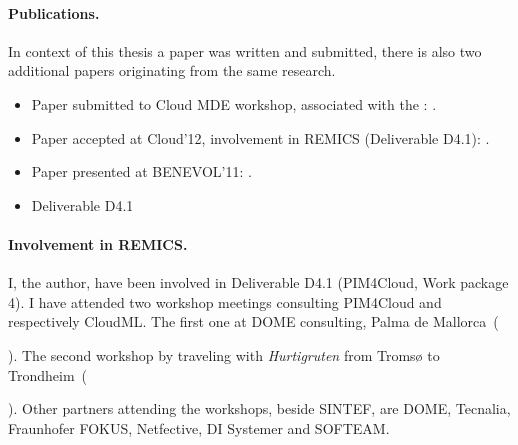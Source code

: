 \paragraph{Publications.}

In context of this thesis a paper was written and submitted,
there is also two additional papers originating from the same research.

\begin{itemize}
  \item
    Paper submitted to Cloud MDE workshop, associated with the :
    .
  \item
    Paper accepted at Cloud'12, involvement in REMICS (Deliverable D4.1):
    .
  \item
    Paper presented at BENEVOL'11:
    .
   \item 
     Deliverable D4.1
\end{itemize}

\paragraph{Involvement in REMICS.}

I, the author, have been involved in  Deliverable D4.1 (PIM4Cloud, Work package 4).
I have attended two workshop meetings consulting PIM4Cloud and respectively CloudML.
The first one at DOME consulting, Palma de Mallorca~(\date{June 2011}).
The second workshop by traveling with \emph{Hurtigruten} from Tromsø to Trondheim~(\date{September 2011}).
Other partners attending the workshops, beside SINTEF, are DOME, Tecnalia, Fraunhofer FOKUS, Netfective, DI Systemer and SOFTEAM.
